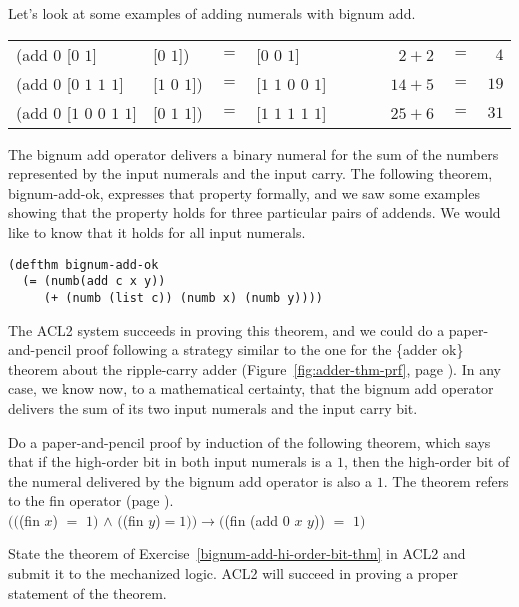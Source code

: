 Let's look at some examples of adding numerals with bignum \textsf{add}.
\begin{center}
\addtolength{\tabcolsep}{-4pt}
\begin{tabular}{llclr|l|rcr}
\textsf{(add $0$ [$0$ $1$]}             &\textsf{[$0$ $1$])}     & $=$ &\textsf{[$0$ $0$ $1$]}         &&& ~~$2 + 2$  &$=$& $4$  \\
\textsf{(add $0$ [$0$ $1$ $1$ $1$]}     &\textsf{[$1$ $0$ $1$])} & $=$ &\textsf{[$1$ $1$ $0$ $0$ $1$]} &&& ~~$14 + 5$ &$=$& $19$ \\
\textsf{(add $0$ [$1$ $0$ $0$ $1$ $1$]} &\textsf{[$0$ $1$ $1$])} & $=$ &\textsf{[$1$ $1$ $1$ $1$ $1$]} &&& ~~$25 + 6$ &$=$& $31$ \\
\end{tabular}
\addtolength{\tabcolsep}{4pt}
\end{center}

The bignum \textsf{add} operator
delivers a binary numeral for the sum of
the numbers represented by the input numerals and the input carry.
The following theorem, \textsf{bignum-add-ok},
expresses that property formally,
and we saw some examples showing
that the property holds for three
particular pairs of addends.
We would like to know that it
holds for all input numerals.

\label{bignum-adder-thm}
\begin{Verbatim}
(defthm bignum-add-ok
  (= (numb(add c x y))
     (+ (numb (list c)) (numb x) (numb y))))
\end{Verbatim}

The ACL2 system succeeds in proving this theorem,
and we could do a paper-and-pencil proof following a strategy
similar to the one for the \{adder ok\} theorem about the ripple-carry adder
(Figure~\ref{fig:adder-thm-prf}, page \pageref{fig:adder-thm-prf}).
In any case, we know now, to a mathematical certainty,
that the bignum \textsf{add} operator delivers
the sum of its two input numerals and the input carry bit.

\begin{ExerciseList}
\Exercise \label{bignum-add-hi-order-bit-thm}
Do a paper-and-pencil proof by induction of the following
theorem, which says that if the high-order bit in both input numerals is a $1$,
then the high-order bit of the numeral delivered
by the bignum \textsf{add} operator is also a $1$.
The theorem refers to the \textsf{fin} operator (page \pageref{fin-defun}).\\
\hspace*{1cm}$(($\textsf{(fin $x$) $=$ $1)$ $\wedge$ $($(fin $y$)}$= 1))
\rightarrow ($\textsf{(fin (add 0 $x$ $y$))} $=$ $1)$

\Exercise State the theorem of Exercise~\ref{bignum-add-hi-order-bit-thm}
in ACL2 and submit it to the mechanized logic.
ACL2 will succeed in proving a proper statement of the theorem.
\end{ExerciseList}

